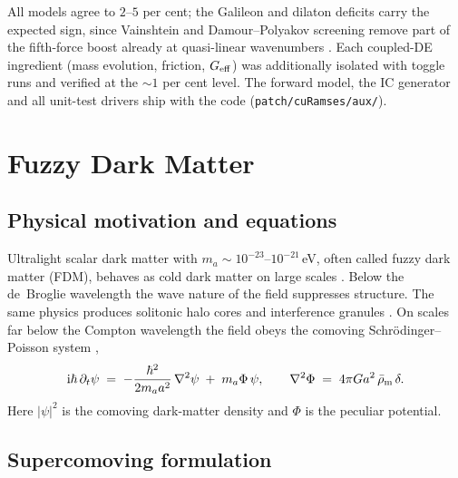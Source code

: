 \documentclass[11pt,a4paper]{article}
\newcommand{\code}[1]{\texttt{#1}}
\newcommand{\Geff}{G_{\rm eff}}
\begin{document}
All models agree to $2$--$5$ per cent; the Galileon and dilaton
deficits carry the expected sign, since Vainshtein and
Damour--Polyakov screening remove part of the fifth-force boost
already at quasi-linear wavenumbers \citep[cf.][]{Barreira2013}.
Each coupled-DE ingredient (mass evolution, friction, $\Geff$) was
additionally isolated with toggle runs and verified at the
$\sim1$ per cent level. The forward model, the IC generator and
all unit-test drivers ship with the code
(\code{patch/cuRamses/aux/}).

\section{Fuzzy Dark Matter}
\label{sec:fdm}

\subsection{Physical motivation and equations}

Ultralight scalar dark matter with
$m_a\sim10^{-23}$--$10^{-21}\,$eV, often called fuzzy dark matter
(FDM), behaves as cold dark matter on large scales
\citep{Hui2017}. Below the de~Broglie wavelength the wave nature
of the field suppresses structure. The same physics produces
solitonic halo cores and interference granules
\citep{Schive2014}. On scales far below the Compton wavelength the
field obeys the comoving Schr\"odinger--Poisson system
\citep{WidrowKaiser1993},
\begin{equation}
{\rm i}\hbar\,\partial_t\psi
 \;=\; -\frac{\hbar^2}{2m_a a^2}\,\nabla^2\psi \;+\; m_a\Phi\,\psi,
\qquad
\nabla^2\Phi \;=\; 4\pi G a^2\,\bar\rho_{\rm m}\,\delta.
\label{eq:fdm_sp}
\end{equation}
Here $|\psi|^2$ is the comoving dark-matter density and $\Phi$ is
the peculiar potential.

\subsection{Supercomoving formulation}
\end{document}
